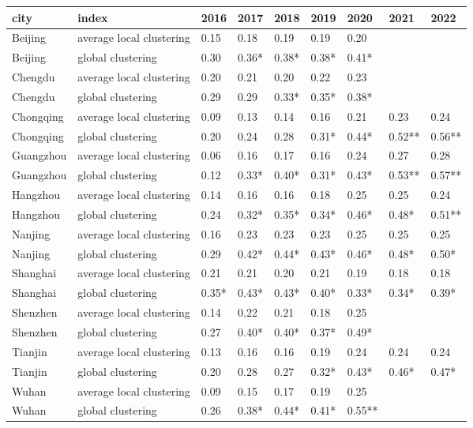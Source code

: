 \begin{tabular}{lllllllll}
\hline
 city      & index                    & 2016   & 2017   & 2018   & 2019   & 2020   & 2021    & 2022   \\
\hline
 Beijing   & average local clustering & 0.15   & 0.18   & 0.19   & 0.19   & 0.20   &         &        \\
 Beijing   & global clustering        & 0.30   & 0.36*  & 0.38*  & 0.38*  & 0.41*  &         &        \\
 Chengdu   & average local clustering & 0.20   & 0.21   & 0.20   & 0.22   & 0.23   &         &        \\
 Chengdu   & global clustering        & 0.29   & 0.29   & 0.33*  & 0.35*  & 0.38*  &         &        \\
 Chongqing & average local clustering & 0.09   & 0.13   & 0.14   & 0.16   & 0.21   & 0.23    & 0.24   \\
 Chongqing & global clustering        & 0.20   & 0.24   & 0.28   & 0.31*  & 0.44*  & 0.52**  & 0.56** \\
 Guangzhou & average local clustering & 0.06   & 0.16   & 0.17   & 0.16   & 0.24   & 0.27    & 0.28   \\
 Guangzhou & global clustering        & 0.12   & 0.33*  & 0.40*  & 0.31*  & 0.43*  & 0.53**  & 0.57** \\
 Hangzhou  & average local clustering & 0.14   & 0.16   & 0.16   & 0.18   & 0.25   & 0.25    & 0.24   \\
 Hangzhou  & global clustering        & 0.24   & 0.32*  & 0.35*  & 0.34*  & 0.46*  & 0.48*   & 0.51** \\
 Nanjing   & average local clustering & 0.16   & 0.23   & 0.23   & 0.23   & 0.25   & 0.25    & 0.25   \\
 Nanjing   & global clustering        & 0.29   & 0.42*  & 0.44*  & 0.43*  & 0.46*  & 0.48*   & 0.50*  \\
 Shanghai  & average local clustering & 0.21   & 0.21   & 0.20   & 0.21   & 0.19   & 0.18    & 0.18   \\
 Shanghai  & global clustering        & 0.35*  & 0.43*  & 0.43*  & 0.40*  & 0.33*  & 0.34*   & 0.39*  \\
 Shenzhen  & average local clustering & 0.14   & 0.22   & 0.21   & 0.18   & 0.25   &         &        \\
 Shenzhen  & global clustering        & 0.27   & 0.40*  & 0.40*  & 0.37*  & 0.49*  &         &        \\
 Tianjin   & average local clustering & 0.13   & 0.16   & 0.16   & 0.19   & 0.24   & 0.24    & 0.24   \\
 Tianjin   & global clustering        & 0.20   & 0.28   & 0.27   & 0.32*  & 0.43*  & 0.46*   & 0.47*  \\
 Wuhan     & average local clustering & 0.09   & 0.15   & 0.17   & 0.19   & 0.25   &         &        \\
 Wuhan     & global clustering        & 0.26   & 0.38*  & 0.44*  & 0.41*  & 0.55** &         &        \\
\hline
\end{tabular}